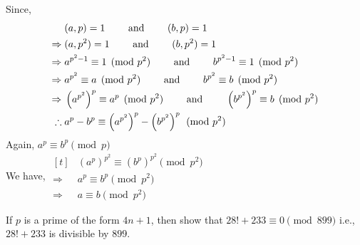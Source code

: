 \documentclass[12pt,class=book,crop=false]{standalone}
\begin{document}
\begin{soln}
    Since,
    \begin{align}
        &(a,p)=1\qquad \text{ and }\qquad (b,p)=1\notag\\
        \Rightarrow\;&(a,p^2)=1\qquad \text{ and }\qquad (b,p^2)=1\notag\\
        \Rightarrow\;&a^{p^2-1}\equiv 1\pmod{p^2}\qquad \text{ and }\qquad b^{p^2-1}\equiv1\pmod{p^2}\notag\\
        \Rightarrow\;&a^{p^2}\equiv a\pmod{p^2}\qquad \text{ and }\qquad {b}^{p^2}\equiv b\pmod{p^2}\notag\\
        \Rightarrow\;&\left(a^{p^2}\right)^p\equiv a^p \pmod{p^2}\qquad \text{ and }\qquad \left({b}^{p^2}\right)^p\equiv b\pmod{p^2}\notag\\
        \therefore\;&a^{p}-b^p\equiv \left(a^{p^2}\right)^p-\left(b^{p^2}\right)^p \pmod{p^2}\notag
    \end{align}
    Again, $ a^p\equiv b^p\pmod{p} $\\
    We have, $ \begin{aligned}[t]
        &\left(a^{p}\right)^{p^2}\equiv \left(b^{p}\right)^{p^2} \pmod{p^2}\\
        \Rightarrow\; &a^{p} \equiv b^{p}\pmod{p^2}\\
        \Rightarrow\; &a \equiv b\pmod{p^2}
    \end{aligned} $
\end{soln}
\begin{qn}
    If $ p $ is a prime of the form $ 4n+1 $, then show that $ 28!+233\equiv 0\pmod{899} $ i.e., $ 28!+233 $ is divisible by $ 899 $.
\end{qn}
\end{document}
